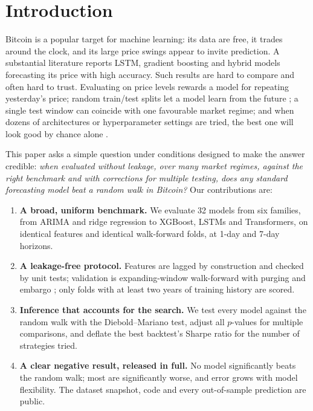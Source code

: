 \documentclass[conference]{IEEEtran}
\begin{document}
\section{Introduction}
\label{sec:intro}
Bitcoin is a popular target for machine learning: its data are free, it trades around the clock, and its large price swings appear to invite prediction. A substantial literature reports LSTM, gradient boosting and hybrid models forecasting its price with high accuracy. Such results are hard to compare and often hard to trust. Evaluating on price levels rewards a model for repeating yesterday's price; random train/test splits let a model learn from the future \cite{bergmeir2012, kapoor2023}; a single test window can coincide with one favourable market regime; and when dozens of architectures or hyperparameter settings are tried, the best one will look good by chance alone \cite{harvey2016, bailey2014}.

This paper asks a simple question under conditions designed to make the answer credible: \emph{when evaluated without leakage, over many market regimes, against the right benchmark and with corrections for multiple testing, does any standard forecasting model beat a random walk in Bitcoin?} Our contributions are:
\begin{enumerate}
  \item \textbf{A broad, uniform benchmark.} We evaluate 32 models from six families, from ARIMA and ridge regression to XGBoost, LSTMs and Transformers, on identical features and identical walk-forward folds, at 1-day and 7-day horizons.
  \item \textbf{A leakage-free protocol.} Features are lagged by construction and checked by unit tests; validation is expanding-window walk-forward with purging and embargo \cite{lopezdeprado2018}; only folds with at least two years of training history are scored.
  \item \textbf{Inference that accounts for the search.} We test every model against the random walk with the Diebold--Mariano test, adjust all $p$-values for multiple comparisons, and deflate the best backtest's Sharpe ratio for the number of strategies tried.
  \item \textbf{A clear negative result, released in full.} No model significantly beats the random walk; most are significantly worse, and error grows with model flexibility. The dataset snapshot, code and every out-of-sample prediction are public.
\end{enumerate}
\end{document}
